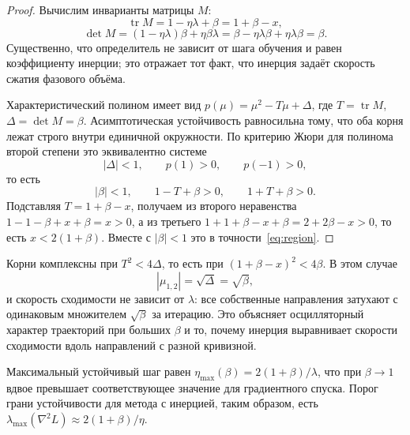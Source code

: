 \begin{proof}
Вычислим инварианты матрицы $M$:
\begin{equation}
  \operatorname{tr} M = 1 - \eta\lambda + \beta = 1 + \beta - x,
\end{equation}
\begin{equation}
  \det M = (1-\eta\lambda)\beta + \eta\beta\lambda = \beta - \eta\lambda\beta + \eta\lambda\beta = \beta .
\end{equation}
Существенно, что определитель не зависит от шага обучения и равен коэффициенту
инерции; это отражает тот факт, что инерция задаёт скорость сжатия фазового
объёма.

Характеристический полином имеет вид $p(\mu) = \mu^2 - T\mu + \Delta$, где
$T=\operatorname{tr}M$, $\Delta = \det M = \beta$. Асимптотическая устойчивость
равносильна тому, что оба корня лежат строго внутри единичной окружности.
По критерию Жюри для полинома второй степени это эквивалентно системе
\begin{equation}
  |\Delta| < 1, \qquad p(1) > 0, \qquad p(-1) > 0,
\end{equation}
то есть
\begin{equation}
  |\beta| < 1, \qquad 1 - T + \beta > 0, \qquad 1 + T + \beta > 0 .
\end{equation}
Подставляя $T = 1+\beta-x$, получаем из второго неравенства
$1 - 1 - \beta + x + \beta = x > 0$, а из третьего
$1 + 1 + \beta - x + \beta = 2 + 2\beta - x > 0$, то есть $x < 2(1+\beta)$.
Вместе с $|\beta|<1$ это в точности~\eqref{eq:region}.
\end{proof}

\begin{corollary}
Корни комплексны при $T^2 < 4\Delta$, то есть при
$(1+\beta-x)^2 < 4\beta$. В этом случае
\begin{equation}
  |\mu_{1,2}| = \sqrt{\Delta} = \sqrt{\beta},
\end{equation}
и скорость сходимости не зависит от $\lambda$: все собственные направления
затухают с одинаковым множителем $\sqrt{\beta}$ за итерацию. Это объясняет
осцилляторный характер траекторий при больших $\beta$ и то, почему инерция
выравнивает скорости сходимости вдоль направлений с разной кривизной.
\end{corollary}

\begin{corollary}
Максимальный устойчивый шаг равен $\eta_{\max}(\beta) = 2(1+\beta)/\lambda$,
что при $\beta\to 1$ вдвое превышает соответствующее значение для градиентного
спуска. Порог грани устойчивости для метода с инерцией, таким образом, есть
$\lambda_{\max}(\nabla^2 L) \approx 2(1+\beta)/\eta$.
\end{corollary}

